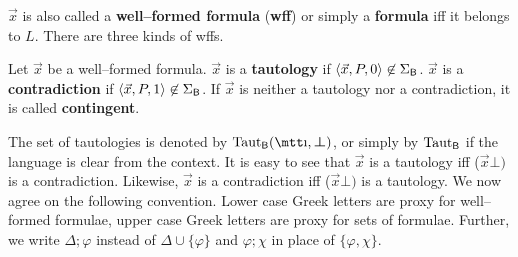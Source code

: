 $\vec{x}$ is also called a \textbf{well--formed formula} (\textbf{wff}) 
or simply a \textbf{formula} 
iff it belongs to $L$. There are three kinds of wffs.
\begin{defn}
Let $\vec{x}$ be a well--formed formula. $\vec{x}$ is a 
\textbf{tautology} if $\langle \vec{x}, P, 0\rangle \not\in \Sigma_{\mathsf{B}}$. 
$\vec{x}$ is a \textbf{contradiction} if $\langle\vec{x}, P, 1\rangle
\not\in \Sigma_{\mathsf{B}}$. If $\vec{x}$ is neither a tautology
nor a contradiction, it is called \textbf{contingent}.
\end{defn}
The set of tautologies is denoted by 
$\Taut_{\mathsf{B}}(\mbox{\mtt\symbol{25}},\sbot)$, 
or simply by $\operatorname{Taut}_{\mathsf{B}}$ if the
language is clear from the context. It is easy to see that
$\vec{x}$ is a tautology iff {\mtt ($\vec{x}$$\bot)$} 
is a contradiction. Likewise, $\vec{x}$ is a contradiction iff 
{\mtt ($\vec{x}$$\bot)$} is a tautology. We now agree 
on the following convention. Lower case Greek letters are proxy 
for well--formed formulae, upper case Greek letters are proxy for 
sets of formulae. Further, we write $\Delta; \varphi$ instead of
$\Delta\cup \{\varphi\}$ and $\varphi;\chi$ in place of
$\{\varphi, \chi\}$.

